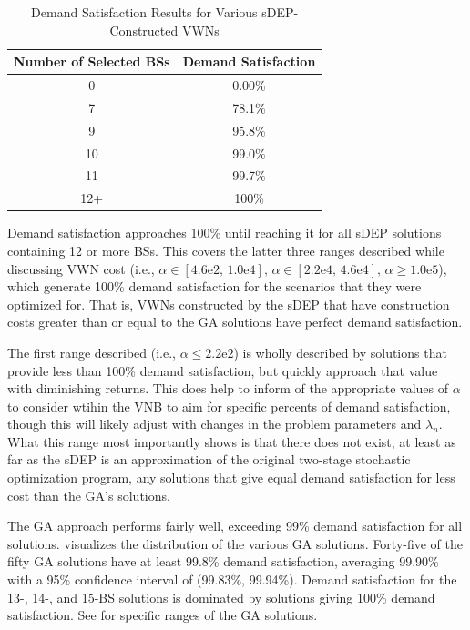 \documentclass[12pt,dvipsnames]{report}
\newcommand{\expnumber}[2]{{#1}\mathrm{e}{#2}}
\begin{document}
\begin{table}[tp]
\centering
\caption[Preliminary Simulation Demand Satisfaction of sDEP-Constructed VWNs]{Demand Satisfaction Results for Various sDEP-Constructed VWNs}
\begin{tabular}{|c|c|} 
\hline
\textbf{Number of Selected BSs} & \textbf{Demand Satisfaction} \\
\hline
0 & 0.00\% \\
\hline
7 & 78.1\% \\
\hline
9 & 95.8\% \\
\hline
10 & 99.0\% \\
\hline
11 & 99.7\% \\
\hline
12+ & 100\% \\
\hline
\end{tabular}
\label{tab:Prelim_sDEPDemandSatisfaction}
\end{table}

Demand satisfaction approaches 100\% until reaching it for all sDEP solutions containing 12 or more BSs.  This covers the latter three ranges described while discussing VWN cost (i.e., $\alpha \in \left[ \expnumber{4.6}{2},\, \expnumber{1.0}{4} \right],\, \alpha \in \left[ \expnumber{2.2}{4},\, \expnumber{4.6}{4} \right],\, \alpha \geq \expnumber{1.0}{5}$), which generate 100\% demand satisfaction for the scenarios that they were optimized for.  That is, VWNs constructed by the sDEP that have construction costs greater than or equal to the GA solutions have perfect demand satisfaction.

The first range described (i.e., $\alpha \leq \expnumber{2.2}{2}$) is wholly described by solutions that provide less than 100\% demand satisfaction, but quickly approach that value with diminishing returns.  This does help to inform of the appropriate values of $\alpha$ to consider wtihin the VNB to aim for specific percents of demand satisfaction, though this will likely adjust with changes in the problem parameters and $\lambda_n$.  What this range most importantly shows is that there does not exist, at least as far as the sDEP is an approximation of the original two-stage stochastic optimization program, any solutions that give equal demand satisfaction for less cost than the GA's solutions.

The GA approach performs fairly well, exceeding 99\% demand satisfaction for all solutions.   visualizes the distribution of the various GA solutions.  Forty-five of the fifty GA solutions have at least 99.8\% demand satisfaction, averaging 99.90\% with a 95\% confidence interval of (99.83\%, 99.94\%).  Demand satisfaction for the 13-, 14-, and 15-BS solutions is dominated by solutions giving 100\% demand satisfaction.  See  for specific ranges of the GA solutions.
\end{document}
